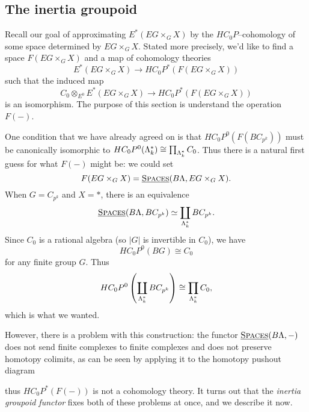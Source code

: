 \subsection*{The inertia groupoid}

Recall our goal of approximating $E^*(EG \times_G X)$ by the $HC_0P$--cohomology of some space determined by $EG \times_G X$. Stated more precisely, we'd like to find a space $F(EG \times_G X)$ and a map of cohomology theories
\[
E^*(EG \times_G X) \to HC_0P^*(F(EG \times_G X))
\]
such that the induced map
\[
C_0 \otimes_{E^0} E^*(EG \times_G X) \to HC_0P^*(F(EG \times_G X))
\]
is an isomorphism. The purpose of this section is understand the operation $F(-)$. 

One condition that we have already agreed on is that $HC_0P^0(F(BC_{p^k}))$ must be canonically isomorphic to $HC_0P^0(\Lambda_k^*) \cong \prod_{\Lambda_k^*}C_0$. Thus there is a natural first guess for what $F(-)$ might be: we could set 
\[
F(EG \times_G X) = \operatorname{\underline{\smash{\normalfont\textsc{Spaces}}}}(B\Lambda, EG \times_G X).
\]
When $G = C_{p^k}$ and $X = *$, there is an equivalence
\[
\operatorname{\underline{\smash{\normalfont\textsc{Spaces}}}}(B\Lambda, BC_{p^k}) \simeq \coprod_{\Lambda_k^*} BC_{p^k}.
\]
Since $C_0$ is a rational algebra (so $|G|$ is invertible in $C_0$), we have 
\[
HC_0P^0(BG) \cong C_0
\]
for any finite group $G$. Thus
\[
HC_0P^0\left(\coprod_{\Lambda_k^*} BC_{p^k}\right) \cong \prod_{\Lambda_k^*}C_0,
\]
which is what we wanted.

However, there is a problem with this construction: the functor $\operatorname{\underline{\smash{\normalfont\textsc{Spaces}}}}(B\Lambda,-)$ does not send finite complexes to finite complexes and does not preserve homotopy colimits, as can be seen by applying it to the homotopy pushout diagram
\begin{center}
\end{center}
thus $HC_0P^*(F(-))$ is not a cohomology theory.  It turns out that the \textit{inertia groupoid functor} fixes both of these problems at once, and we describe it now.

%

